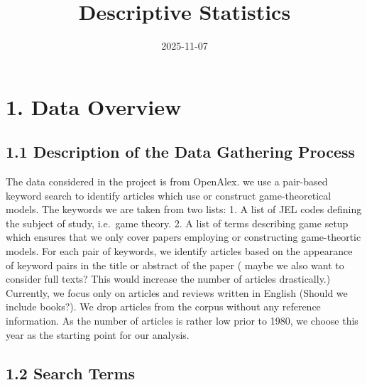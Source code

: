 \documentclass[
  12pt,
]{article}
\title{Descriptive Statistics}
\author{}
\date{\vspace{-2.5em}2025-11-07}
\begin{document}
\maketitle

\section{1. Data Overview}\label{data-overview}

\subsection{1.1 Description of the Data Gathering
Process}\label{description-of-the-data-gathering-process}

The data considered in the project is from OpenAlex. we use a pair-based
keyword search to identify articles which use or construct
game-theoretical models. The keywords we are taken from two lists: 1. A
list of JEL codes defining the subject of study, i.e.~game theory. 2. A
list of terms describing game setup which ensures that we only cover
papers employing or constructing game-theortic models. For each pair of
keywords, we identify articles based on the appearance of keyword pairs
in the title or abstract of the paper (\color{red} maybe we also want to
consider full texts? This would increase the number of articles
drastically.\color{black}) Currently, we focus only on articles and
reviews written in English (\color{red}Should we include
books?\color{black}). We drop articles from the corpus without any
reference information. As the number of articles is rather low prior to
1980, we choose this year as the starting point for our analysis.

\subsection{1.2 Search Terms}\label{search-terms}
\end{document}
